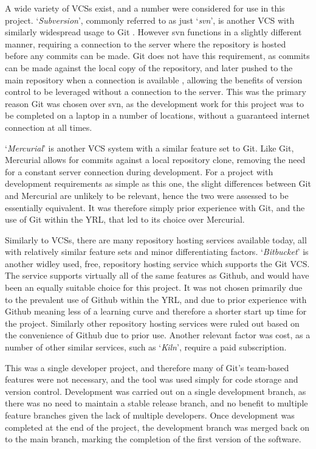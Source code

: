 A wide variety of VCSs exist, and a number were considered for use in this project. `\textit{Subversion}', commonly referred to as just `\textit{svn}', is another VCS with similarly widespread usage to Git \cite{Subversion}. However svn functions in a slightly different manner, requiring a connection to the server where the repository is hosted before any commits can be made. Git does not have this requirement, as commits can be made against the local copy of the repository, and later pushed to the main repository when a connection is available \cite{ProGit}, allowing the benefits of version control to be leveraged without a connection to the server. This was the primary reason Git was chosen over svn, as the development work for this project was to be completed on a laptop in a number of locations, without a guaranteed internet connection at all times.

`\textit{Mercurial}' \cite{Mercurial} is another VCS system with a similar feature set to Git. Like Git, Mercurial allows for commits against a local repository clone, removing the need for a constant server connection during development. For a project with development requirements as simple as this one, the slight differences between Git and Mercurial are unlikely to be relevant, hence the two were assessed to be essentially equivalent. It was therefore simply prior experience with Git, and the use of Git within the YRL, that led to its choice over Mercurial.

Similarly to VCSs, there are many repository hosting services available today, all with relatively similar feature sets and minor differentiating factors. `\textit{Bitbucket}' is another widley used, free, repository hosting service which supports the Git VCS. The service supports virtually all of the same features as Github, and would have been an equally suitable choice for this project. It was not chosen primarily due to the prevalent use of Github within the YRL, and due to prior experience with Github meaning less of a learning curve and therefore a shorter start up time for the project. Similarly other repository hosting services were ruled out based on the convenience of Github due to prior use. Another relevant factor was cost, as a number of other similar services, such as `\textit{Kiln}', require a paid subscription.

This was a single developer project, and therefore many of Git's team-based features were not necessary, and the tool was used simply for code storage and version control. Development was carried out on a single development branch, as there was no need to maintain a stable release branch, and no benefit to multiple feature branches given the lack of multiple developers. Once development was completed at the end of the project, the development branch was merged back on to the main branch, marking the completion of the first version of the software.

